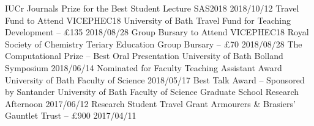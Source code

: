 \begin{cvpubs}
  \cvpub
    {IUCr Journals Prize for the Best Student Lecture}
    {SAS2018}
    {2018/10/12}
  \cvpub
    {Travel Fund to Attend VICEPHEC18}
    {University of Bath Travel Fund for Teaching Development -- £135}
    {2018/08/28}
  \cvpub
    {Group Bursary to Attend VICEPHEC18}
    {Royal Society of Chemistry Teriary Education Group Bursary -- £70}
    {2018/08/28}
  \cvpub
    {The Computational Prize -- Best Oral Presentation}
    {University of Bath Bolland Symposium}
    {2018/06/14}
  \cvpub
    {Nominated for Faculty Teaching Assistant Award}
    {University of Bath Faculty of Science}
    {2018/05/17}
  \cvpub
    {Best Talk Award -- Sponsored by Santander}
    {University of Bath Faculty of Science Graduate School Research Afternoon}
    {2017/06/12}
  \cvpub
    {Research Student Travel Grant}
    {Armourers \& Brasiers' Gauntlet Trust -- £900}
    {2017/04/11}
\end{cvpubs}
